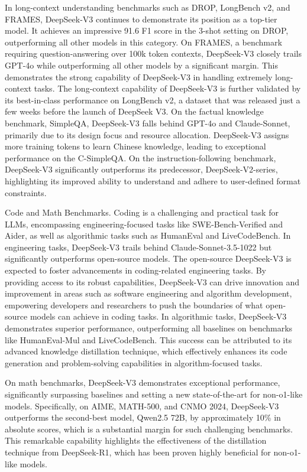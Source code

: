 \documentclass[11pt,a4paper]{article}
\begin{document}
In long-context understanding benchmarks such as DROP, LongBench v2, and FRAMES, DeepSeek-V3 continues to demonstrate its position as a top-tier model. It achieves an impressive 91.6 F1 score in the 3-shot setting on DROP, outperforming all other models in this category. On FRAMES, a benchmark requiring question-answering over 100k token contexts, DeepSeek-V3 closely trails GPT-4o while outperforming all other models by a significant margin. This demonstrates the strong capability of DeepSeek-V3 in handling extremely long-context tasks. The long-context capability of DeepSeek-V3 is further validated by its best-in-class performance on LongBench v2, a dataset that was released just a few weeks before the launch of DeepSeek V3. On the factual knowledge benchmark, SimpleQA, DeepSeek-V3 falls behind GPT-4o and Claude-Sonnet, primarily due to its design focus and resource allocation. DeepSeek-V3 assigns more training tokens to learn Chinese knowledge, leading to exceptional performance on the C-SimpleQA. On the instruction-following benchmark, DeepSeek-V3 significantly outperforms its predecessor, DeepSeek-V2-series, highlighting its improved ability to understand and adhere to user-defined format constraints.

Code and Math Benchmarks. Coding is a challenging and practical task for LLMs, encompassing engineering-focused tasks like SWE-Bench-Verified and Aider, as well as algorithmic tasks such as HumanEval and LiveCodeBench. In engineering tasks, DeepSeek-V3 trails behind Claude-Sonnet-3.5-1022 but significantly outperforms open-source models. The open-source DeepSeek-V3 is expected to foster advancements in coding-related engineering tasks. By providing access to its robust capabilities, DeepSeek-V3 can drive innovation and improvement in areas such as software engineering and algorithm development, empowering developers and researchers to push the boundaries of what open-source models can achieve in coding tasks. In algorithmic tasks, DeepSeek-V3 demonstrates superior performance, outperforming all baselines on benchmarks like HumanEval-Mul and LiveCodeBench. This success can be attributed to its advanced knowledge distillation technique, which effectively enhances its code generation and problem-solving capabilities in algorithm-focused tasks.

On math benchmarks, DeepSeek-V3 demonstrates exceptional performance, significantly surpassing baselines and setting a new state-of-the-art for non-o1-like models. Specifically, on AIME, MATH-500, and CNMO 2024, DeepSeek-V3 outperforms the second-best model, Qwen2.5 72B, by approximately 10\% in absolute scores, which is a substantial margin for such challenging benchmarks. This remarkable capability highlights the effectiveness of the distillation technique from DeepSeek-R1, which has been proven highly beneficial for non-o1-like models.
\end{document}
